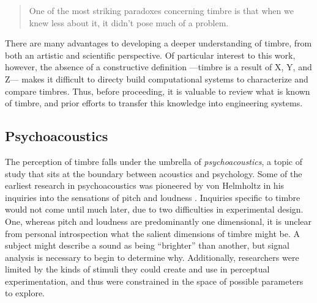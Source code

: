 \begin{quote}
One of the most striking paradoxes concerning timbre is that when we knew less about it, it didn’t pose much of a problem.
\end{quote}

There are many advantages to developing a deeper understanding of timbre, from both an artistic and scientific perspective.
Of particular interest to this work, however, the absence of a constructive definition ---timbre is a result of X, Y, and Z--- makes it difficult to directy build computational systems to characterize and compare timbres.
Thus, before proceeding, it is valuable to review what is known of timbre, and prior efforts to transfer this knowledge into engineering systems.


\subsection{Psychoacoustics}
The perception of timbre falls under the umbrella of \emph{psychoacoustics}, a topic of study that sits at the boundary between acoustics and psychology.
Some of the earliest research in psychoacoustics was pioneered by von Helmholtz in his inquiries into the sensations of pitch and loudness \cite{Cook1995?}.
Inquiries specific to timbre would not come until much later, due to two difficulties in experimental design.
One, whereas pitch and loudness are predominantly one dimensional, it is unclear from personal introspection what the salient dimensions of timbre might be.
A subject might describe a sound as being ``brighter'' than another, but signal analysis is necessary to begin to determine why.
Additionally, researchers were limited by the kinds of stimuli they could create and use in perceptual experimentation, and thus were constrained in the space of possible parameters to explore.

